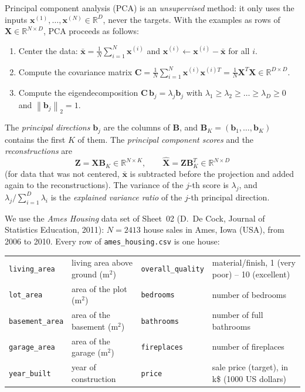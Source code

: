 \documentclass[hidelinks,10pt]{article}
\newcommand\norm[1]{\left\lVert#1\right\rVert}
\providecommand{\xx}{\mathbf{x}}
\providecommand{\XX}{\mathbf{X}}
\providecommand{\ZZ}{\mathbf{Z}}
\providecommand{\bb}{\mathbf{b}}
\providecommand{\BB}{\mathbf{B}}
\providecommand{\CC}{\mathbf{C}}
\newcommand{\R}{\mathbb{R}}
\begin{document}
Principal component analysis (PCA) is an \emph{unsupervised} method: it only uses the inputs $\xx^{(1)}, \dots, \xx^{(N)} \in \R^D$, never the targets. With the examples as rows of $\XX \in \R^{N \times D}$, PCA proceeds as follows:
\begin{enumerate}[label=\arabic*., itemsep=0.1em, topsep=0.2em]
    \item Center the data: $\bar{\xx} = \frac{1}{N}\sum_{i=1}^{N}\xx^{(i)}$ and $\xx^{(i)} \leftarrow \xx^{(i)} - \bar{\xx}$ for all $i$.
    \item Compute the covariance matrix $\CC = \frac{1}{N}\sum_{i=1}^{N}\xx^{(i)}\xx^{(i)T} = \frac{1}{N}\XX^T\XX \in \R^{D \times D}$.
    \item Compute the eigendecomposition $\CC\,\bb_j = \lambda_j\bb_j$ with $\lambda_1 \geq \lambda_2 \geq \dots \geq \lambda_D \geq 0$ and $\norm{\bb_j}_2 = 1$.
\end{enumerate}
The \emph{principal directions} $\bb_j$ are the columns of $\BB$, and $\BB_K = (\bb_1, \dots, \bb_K)$ contains the first $K$ of them. The \emph{principal component scores} and the \emph{reconstructions} are
\begin{equation}
    \ZZ = \XX\BB_K \in \R^{N \times K}, \qquad \hat{\XX} = \ZZ\BB_K^T \in \R^{N \times D}
    \label{eq:pca}
\end{equation}
(for data that was not centered, $\bar{\xx}$ is subtracted before the projection and added again to the reconstructions). The variance of the $j$-th score is $\lambda_j$, and $\lambda_j / \sum_{i=1}^{D}\lambda_i$ is the \emph{explained variance ratio} of the $j$-th principal direction.

We use the \emph{Ames Housing} data set of Sheet~02 (D.~De Cock, Journal of Statistics Education, 2011): $N = 2413$ house sales in Ames, Iowa (USA), from 2006 to 2010. Every row of \texttt{ames\_housing.csv} is one house:

\begin{center}
\footnotesize
\begin{tabular}{ll@{\hspace{1.5em}}ll}
    \toprule
    \texttt{living\_area} & living area above ground (m$^2$) & \texttt{overall\_quality} & material/finish, 1 (very poor) -- 10 (excellent)\\
    \texttt{lot\_area} & area of the plot (m$^2$) & \texttt{bedrooms} & number of bedrooms\\
    \texttt{basement\_area} & area of the basement (m$^2$) & \texttt{bathrooms} & number of full bathrooms\\
    \texttt{garage\_area} & area of the garage (m$^2$) & \texttt{fireplaces} & number of fireplaces\\
    \texttt{year\_built} & year of construction & \texttt{price} & sale price (target), in k\$ (1000 US dollars)\\
    \bottomrule
\end{tabular}
\end{center}
\end{document}
